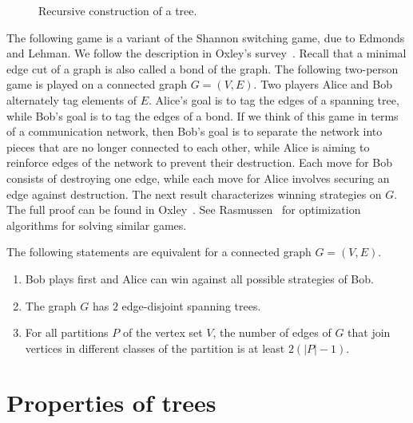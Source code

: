 \begin{figure}[!htbp]
\centering

\caption{Recursive construction of a tree.}
\label{fig:trees_forests:recursive_construction_tree}
\end{figure}

The following game is a variant of the Shannon
switching game, due to Edmonds and
Lehman. We follow the description
in Oxley's survey~\cite{Oxley2003}. Recall that a
minimal edge cut of a graph is also called a bond of the
graph. The following two-person game is played on a connected graph
$G = (V,E)$. Two players Alice and Bob alternately tag elements of
$E$. Alice's goal is to tag the edges of a spanning tree, while Bob's
goal is to tag the edges of a bond. If we think of this game in terms
of a communication network, then Bob's goal is to separate the network
into pieces that are no longer connected to each other, while Alice is
aiming to reinforce edges of the network to prevent their
destruction. Each move for Bob consists of destroying one edge, while
each move for Alice involves securing an edge against destruction. The
next result characterizes winning strategies on $G$. The full proof
can be found in Oxley~\cite{Oxley2003}. See
Rasmussen~\cite{Rasmussen2007} for
optimization algorithms for solving
similar games.

\begin{theorem}
The following statements are equivalent for a connected graph
$G = (V, E)$.
\begin{enumerate}
\item Bob plays first and Alice can win against all possible
  strategies of Bob.

\item The graph $G$ has $2$ edge-disjoint spanning trees.

\item For all partitions $P$ of the vertex set $V$, the number of
  edges of $G$ that join vertices in different classes of the
  partition is at least $2(|P| - 1)$.
\end{enumerate}
\end{theorem}



\section{Properties of trees}


